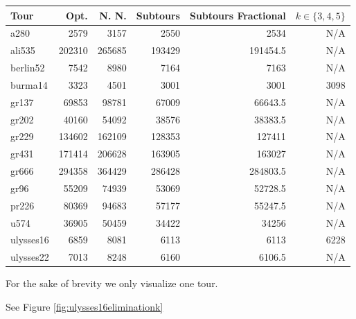 \documentclass[12pt,letterpaper]{article}
\begin{document}
\begin{enumerate}
      \begin{tabular}{l | r | r | r | r | r}
        \hline
        \hline
        Tour      & Opt.    & N. N.            & Subtours & Subtours Fractional & $k \in \{3, 4, 5\}$ \\
        \hline
        a280      & 2579    & 3157             & 2550     & 2534                & N/A                 \\
        ali535    & 202310  & 265685           & 193429   & 191454.5            & N/A                 \\
        berlin52  & 7542    & 8980             & 7164     & 7163                & N/A                 \\
        burma14   & 3323    & 4501             & 3001     & 3001                & 3098                \\
        gr137     & 69853   & 98781            & 67009    & 66643.5             & N/A                 \\
        gr202     & 40160   & 54092            & 38576    & 38383.5             & N/A                 \\
        gr229     & 134602  & 162109           & 128353   & 127411              & N/A                 \\
        gr431     & 171414  & 206628           & 163905   & 163027              & N/A                 \\
        gr666     & 294358  & 364429           & 286428   & 284803.5            & N/A                 \\
        gr96      & 55209   & 74939            & 53069    & 52728.5             & N/A                 \\
        pr226     & 80369   & 94683            & 57177    & 55247.5             & N/A                 \\
        u574      & 36905   & 50459            & 34422    & 34256               & N/A                 \\
        ulysses16 & 6859    & 8081             & 6113     & 6113                & 6228                \\
        ulysses22 & 7013    & 8248             & 6160     & 6106.5              & N/A                 \\
        \hline
      \end{tabular}


      For the sake of brevity we only visualize one tour.

      See Figure \ref{fig:ulysses16eliminationk}


\end{enumerate}
\end{document}
